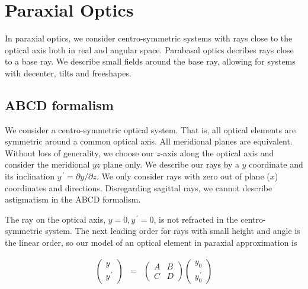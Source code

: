 \documentclass[12pt,a4paper,twoside,openright,BCOR10mm,headsepline,titlepage,abstracton,chapterprefix,final]{scrreprt}
\begin{document}
\section{Paraxial Optics}
In paraxial optics, we consider centro-symmetric systems with rays close to the optical axis both in real and angular space. 
Parabasal optics decribes rays close to a base ray. 
We describe small fields around the base ray,
allowing for systems with decenter, tilts and freeshapes. 

\subsection{ABCD formalism}
We consider a centro-symmetric optical system. 
That is, all optical elements are symmetric around a common optical axis.
All meridional planes are equivalent.
Without loss of generality, we choose our $z$-axis along the optical axis and consider the meridional $yz$ plane only.
We describe our rays by a $y$ coordinate and its inclination $y^{\,\prime} = \partial y / \partial z$. 
We only consider rays with zero out of plane ($x$) coordinates and directions.
Disregarding sagittal rays, we cannot describe astigmatism in the ABCD formalism.

The ray on the optical axis, $y=0, y^{\,\prime}=0$, is not refracted in the centro-symmetric system.
The next leading order for rays with small height and angle is the linear order, so our model of an optical element in paraxial approximation is

\begin{eqnarray}
 \begin{pmatrix}
  y \\ y^{\,\prime}
 \end{pmatrix}
 &=&
 \begin{pmatrix}
  A & B \\ C & D
 \end{pmatrix}
 \begin{pmatrix}
  y_0 \\ y_0^{\,\prime}
 \end{pmatrix}
\end{eqnarray}
\end{document}
